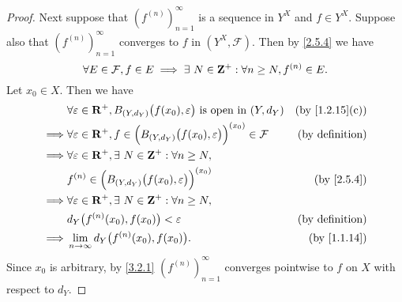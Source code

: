\begin{proof}
  Next suppose that \((f^{(n)})_{n = 1}^\infty\) is a sequence in \(Y^X\) and \(f \in Y^X\).
  Suppose also that \((f^{(n)})_{n = 1}^\infty\) converges to \(f\) in \((Y^X, \mathcal{F})\).
  Then by \cref{2.5.4} we have
  \[
    \forall E \in \mathcal{F}, f \in E \implies \exists\ N \in \mathbf{Z}^+ : \forall n \geq N, f^{(n)} \in E.
  \]
  Let \(x_0 \in X\).
  Then we have
  \begin{align*}
             & \forall \varepsilon \in \R^+, B_{(Y, d_Y)}\big(f(x_0), \varepsilon\big) \text{ is open in } (Y, d_Y)            & \text{(by \cref{1.2.15}(c))} \\
    \implies & \forall \varepsilon \in \R^+, f \in \Big(B_{(Y, d_Y)}\big(f(x_0), \varepsilon\big)\Big)^{(x_0)} \in \mathcal{F} & \text{(by definition)}       \\
    \implies & \forall \varepsilon \in \R^+, \exists\ N \in \Z^+ : \forall n \geq N,                                                                          \\
             & f^{(n)} \in \Big(B_{(Y, d_Y)}\big(f(x_0), \varepsilon\big)\Big)^{(x_0)}                                         & \text{(by \cref{2.5.4})}     \\
    \implies & \forall \varepsilon \in \R^+, \exists\ N \in \Z^+ : \forall n \geq N,                                                                          \\
             & d_Y\big(f^{(n)}(x_0), f(x_0)\big) < \varepsilon                                                                 & \text{(by definition)}       \\
    \implies & \lim_{n \to \infty} d_Y\big(f^{(n)}(x_0), f(x_0)\big).                                                          & \text{(by \cref{1.1.14})}
  \end{align*}
  Since \(x_0\) is arbitrary, by \cref{3.2.1} \((f^{(n)})_{n = 1}^\infty\) converges pointwise to \(f\) on \(X\) with respect to \(d_Y\).


\end{proof}
